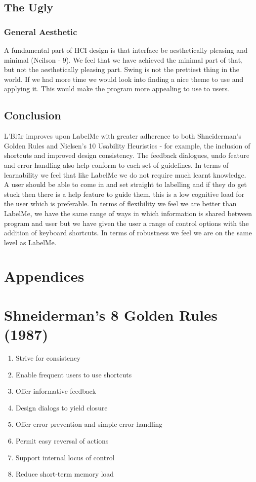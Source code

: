 \documentclass[a4paper,11pt,oneside]{article}
\begin{document}
\subsection{The Ugly}
\subsubsection{General Aesthetic}
A fundamental part of HCI design is that interface be aesthetically pleasing and
minimal (Neilson - 9).  We feel that we have achieved the minimal part of that,
but not the aesthetically pleasing part.  Swing is not the prettiest thing in
the world.  If we had more time we would look into finding a nice theme to use
and applying it.  This would make the program more appealing to use to users.

\subsection{Conclusion}
L'Bl\"{u}r improves upon LabelMe with greater adherence to both Shneiderman's
Golden Rules and Nielsen's 10 Usability Heuristics - for example,
the inclusion of shortcuts and improved design consistency. The feedback
dialogues, undo feature and error handling also help conform to each set of
guidelines.  In terms of learnability we feel that like LabelMe we do not
require much learnt knowledge.  A user should be able to come in and set 
straight to labelling and if they do get stuck then there is a help feature to
guide them, this is a low cognitive load for the user which is preferable.
In terms of flexibility we feel we are better than LabelMe, we have
the same range of ways in which information is shared between program and user
but we have given the user a range of control options with the addition of
keyboard shortcuts.  In terms of robustness we feel we are on the same level as
LabelMe.

\section{Appendices}
\appendix

\section{Shneiderman’s 8 Golden Rules (1987)}
\begin{enumerate}
\item Strive for consistency
\item Enable frequent users to use shortcuts
\item Offer informative feedback
\item Design dialogs to yield closure
\item Offer error prevention and simple error handling
\item Permit easy reversal of actions
\item Support internal locus of control
\item Reduce short-term memory load 
\end{enumerate}
\end{document}
